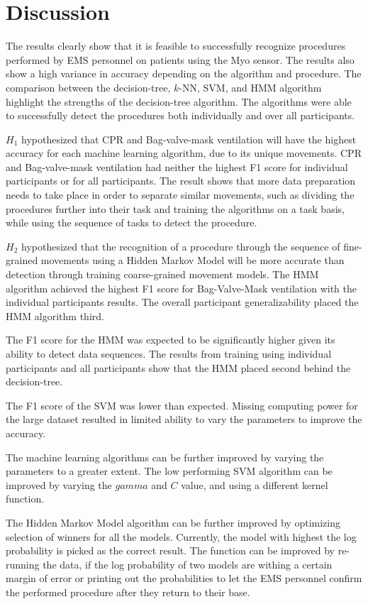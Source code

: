 \section{Discussion}
\label{sec:Results:Discussion}
The results clearly show that it is feasible to successfully recognize procedures performed by EMS personnel on patients using the Myo sensor. The results also show a high variance in accuracy depending on the algorithm and procedure. The comparison between the decision-tree, $k$-NN, SVM, and HMM algorithm highlight the strengths of the decision-tree algorithm. The algorithms were able to successfully detect the procedures both individually and over all participants.
\par $H_1$ hypothesized that CPR and Bag-valve-mask ventilation will have the highest accuracy for each machine learning algorithm, due to its unique movements. CPR and Bag-valve-mask ventilation had neither the highest F1 score for individual participants or for all participants. The result shows that more data preparation needs to take place in order to separate similar movements, such as dividing the procedures further into their task and training the algorithms on a task basis, while using the sequence of tasks to detect the procedure.
\par $H_2$ hypothesized that the recognition of a procedure through the sequence of fine-grained movements using a Hidden Markov Model will be more accurate than detection through training coarse-grained movement models. The HMM algorithm achieved the highest F1 score for Bag-Valve-Mask ventilation with the individual participants results. The overall participant generalizability placed the HMM algorithm third.
\par The F1 score for the HMM was expected to be significantly higher given its ability to detect data sequences. The results from training using individual participants and all participants show that the HMM placed second behind the decision-tree.
\par The F1 score of the SVM was lower than expected. Missing computing power for the large dataset resulted in limited ability to vary the parameters to improve the accuracy. 
\par The machine learning algorithms can be further improved by varying the parameters to a greater extent. The low performing SVM algorithm can be improved by varying the $gamma$ and $C$ value, and using a different kernel function.
\par The Hidden Markov Model algorithm can be further improved by optimizing selection of winners for all the models. Currently, the model with highest the log probability is picked as the correct result. The function can be improved by re-running the data, if the log probability of two models are withing a certain margin of error or printing out the probabilities to let the EMS personnel confirm the performed procedure after they return to their base.
